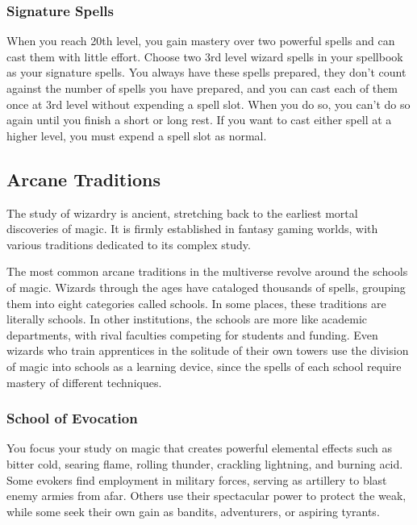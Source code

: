 \documentclass[
]{article}
\begin{document}
\hypertarget{signature-spells}{%
\subsubsection{Signature Spells}\label{signature-spells}}

When you reach 20th level, you gain mastery over two powerful spells and
can cast them with little effort. Choose two 3rd level wizard spells in
your spellbook as your signature spells. You always have these spells
prepared, they don't count against the number of spells you have
prepared, and you can cast each of them once at 3rd level without
expending a spell slot. When you do so, you can't do so again until you
finish a short or long rest. If you want to cast either spell at a
higher level, you must expend a spell slot as normal.

\hypertarget{arcane-traditions}{%
\subsection{Arcane Traditions}\label{arcane-traditions}}

The study of wizardry is ancient, stretching back to the earliest mortal
discoveries of magic. It is firmly established in fantasy gaming worlds,
with various traditions dedicated to its complex study.

The most common arcane traditions in the multiverse revolve around the
schools of magic. Wizards through the ages have cataloged thousands of
spells, grouping them into eight categories called schools. In some
places, these traditions are literally schools. In other institutions,
the schools are more like academic departments, with rival faculties
competing for students and funding. Even wizards who train apprentices
in the solitude of their own towers use the division of magic into
schools as a learning device, since the spells of each school require
mastery of different techniques.

\hypertarget{school-of-evocation}{%
\subsubsection{School of Evocation}\label{school-of-evocation}}

You focus your study on magic that creates powerful elemental effects
such as bitter cold, searing flame, rolling thunder, crackling
lightning, and burning acid. Some evokers find employment in military
forces, serving as artillery to blast enemy armies from afar. Others use
their spectacular power to protect the weak, while some seek their own
gain as bandits, adventurers, or aspiring tyrants.
\end{document}
